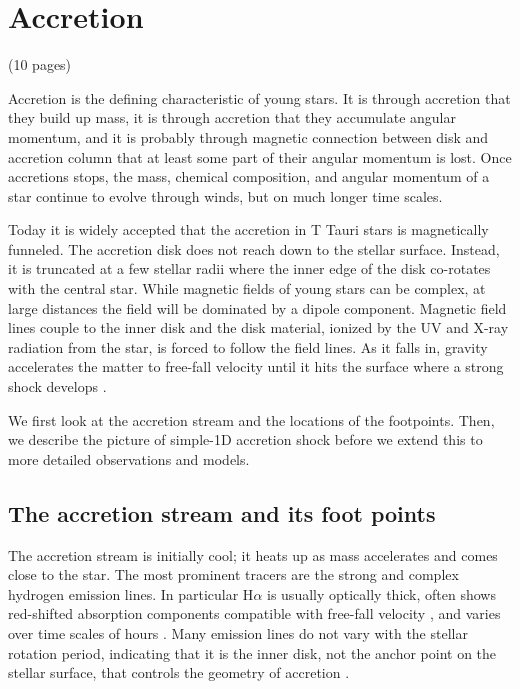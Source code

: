 


\section{Accretion \label{sect:accretion}}
{\color{blue}(10 pages)}

Accretion is the defining characteristic of young stars. It is through accretion that they build up mass, it is through accretion that they accumulate angular momentum, and it is probably through magnetic connection between disk and accretion column that at least some part of their angular momentum is lost. Once accretions stops, the mass, chemical composition, and angular momentum of a star continue to evolve through winds, but on much longer time scales.

Today it is widely accepted that the accretion in T Tauri stars is magnetically funneled. The accretion disk does not reach down to the stellar surface. Instead, it is truncated at a few stellar radii where the inner edge of the disk co-rotates with the central star. While magnetic fields of young stars can be complex, at large distances the field will be dominated by a dipole component. Magnetic field lines couple to the inner disk and the disk material, ionized by the UV and X-ray radiation from the star, is forced to follow the field lines. As it falls in, gravity accelerates the matter to free-fall velocity until it hits the surface where a strong shock develops \cite{Shu_1994}. 

We first look at the accretion stream and the locations of the footpoints. Then, we describe the picture of simple-1D accretion shock  before we extend this to more detailed observations and models.

\subsection{The accretion stream and its foot points}
\label{sect:accretionsrteam}
The accretion stream is initially cool; it heats up as mass accelerates and comes close to the star. The most prominent tracers are the strong and complex hydrogen emission lines. In particular H$\alpha$ is usually optically thick, often shows red-shifted absorption components compatible with free-fall velocity \cite[e.g.][]{2000AJ....119.1881A}, and varies over time scales of hours \cite{dupree_2012}. Many emission lines do not vary with the stellar rotation period, indicating that it is the inner disk, not the anchor point on the stellar surface, that controls the geometry of accretion \cite{2021A&A...649A..68S}.

